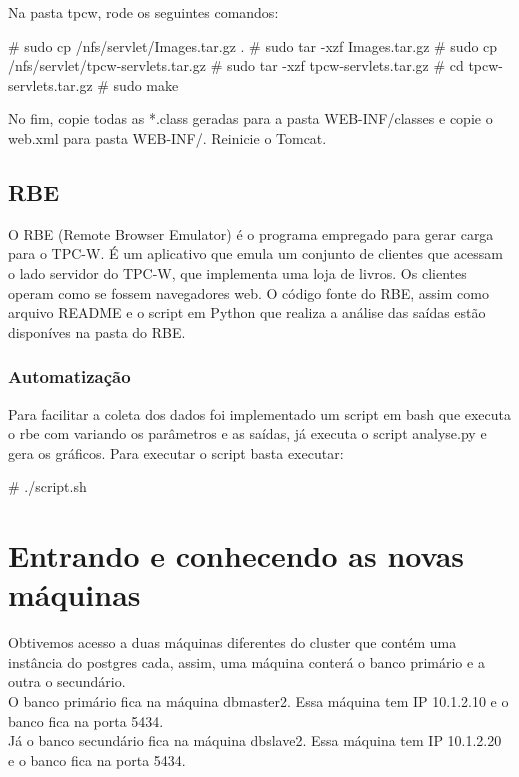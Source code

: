 \documentclass[a4paper,10pt]{article}
\begin{document}
        Na pasta tpcw, rode os seguintes comandos:
        \begin{spverbatim}
            # sudo cp /nfs/servlet/Images.tar.gz .
            # sudo tar -xzf Images.tar.gz
            # sudo cp /nfs/servlet/tpcw-servlets.tar.gz
            # sudo tar -xzf tpcw-servlets.tar.gz
            # cd tpcw-servlets.tar.gz
            # sudo make
        \end{spverbatim}

        No fim, copie todas as *.class geradas para a pasta WEB-INF/classes e copie o web.xml para pasta WEB-INF/. Reinicie o Tomcat.

       \subsection{RBE}
        O RBE (Remote Browser Emulator) é o programa empregado para gerar carga para o TPC-W. É um aplicativo que emula um conjunto de clientes que acessam o lado servidor do TPC-W, que implementa uma loja de livros. Os clientes operam como se fossem navegadores web.
        O código fonte do RBE, assim como arquivo README e o script em Python que realiza a análise das saídas estão disponíves na pasta do RBE.

        \subsubsection{Automatização}
        Para facilitar a coleta dos dados foi implementado um script em bash que executa o rbe com variando os parâmetros e as saídas, já executa o script analyse.py e gera os gráficos.
        Para executar o script basta executar:
        \begin{spverbatim}
        # ./script.sh
        \end{spverbatim}

\section{Entrando e conhecendo as novas máquinas}
    Obtivemos acesso a duas máquinas diferentes do cluster que contém uma instância do postgres cada, assim, uma máquina conterá o banco primário e a outra o secundário.\\
    O banco primário fica na máquina dbmaster2. Essa máquina tem IP 10.1.2.10 e o banco fica na porta 5434.\\
    Já o banco secundário fica na máquina dbslave2. Essa máquina tem IP 10.1.2.20 e o banco fica na porta 5434.
\end{document}
